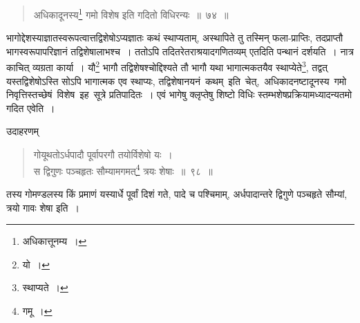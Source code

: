 \documentclass[10pt, openany]{book}
\begin{document}
{{\begin{quote}
    
{\bs अधिकादूनस्य\renewcommand{\thefootnote}{\s १०}\footnote{\s अधिकात्तूनम्य~।} गमो विशेष इति गदितो विधिरन्यः~॥~७४~॥}\end{quote}

{भागोद्देशस्याज्ञातस्वरूपत्वात्तद्विशेषोऽप्यज्ञातः कथं स्थाप्यताम्,
अस्थापिते तु तस्मिन्}
{फला-प्राप्तिः, तदप्राप्तौ भागस्वरूपापरिज्ञानं तद्विशेषालाभश्च~। ततोऽपि
तदितरेतराश्रयादगणितव्यम् एतदिति पन्थानं दर्शयति~। नात्र काचित् व्यग्रता कार्या~।
यौ\renewcommand{\thefootnote}{\s ११}\footnote{\s यो~।} भागौ तद्विशेषश्चोद्दिश्यते तौ भागौ यथा भागात्मकतयैव स्थाप्येते\renewcommand{\thefootnote}{\s १२}\footnote{\s स्थाप्यते~।}, तद्वत्
यस्तद्विशेषोऽस्ति सोऽपि भागात्मक एव}
{स्थाप्यः, तद्विशेषानयनं \,कथम् \,इति \,चेत्, \,अधिकादनष्टादूनस्य \,गमो \,निवृत्तिस्तच्छेषं \,विशेष \,इह \,सूत्रे प्रतिपादितः~। एवं भागेषु क्लृप्तेषु शिष्टो विधिः
स्तम्भशेषप्रक्रियामध्यादन्यतमो गदित एवेति~।}

\newpage

{उदाहरणम्\textemdash}

\begin{quote}
{\eg गोयूथतोऽर्धपादौ पूर्वापरगौ तयोर्विशेषो यः~। \\
 स द्विगुणः पञ्चहृतः सौम्यामगमत्\renewcommand{\thefootnote}{\s १}\footnote{\s *गमू~।} त्रयः शेषाः~॥~९८~॥}\end{quote} 

{तस्य गोमण्डलस्य किं प्रमाणं यस्यार्धे पूर्वां दिशं गते, पादे च
पश्चिमाम्, अर्धपादान्तरे}
{द्विगुणे पञ्चहृते सौम्यां, त्रयो गावः शेषा इति~।}
\vspace{3mm}

}}
\end{document}
